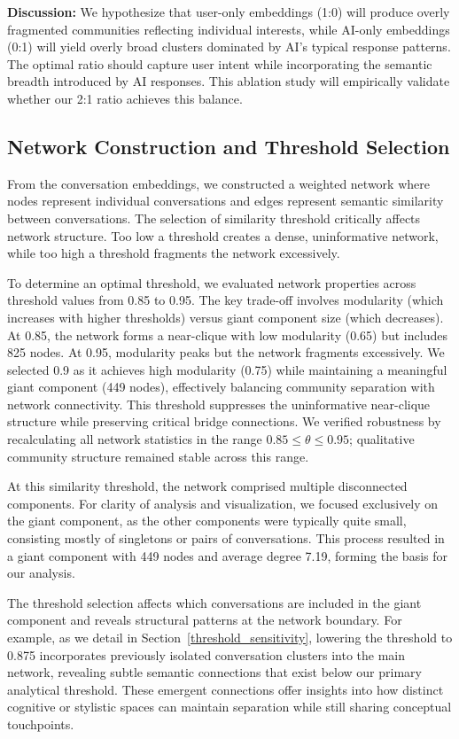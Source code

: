 \documentclass{svproc}
\begin{document}
\textbf{Discussion:} We hypothesize that user-only embeddings (1:0) will produce overly fragmented communities reflecting individual interests, while AI-only embeddings (0:1) will yield overly broad clusters dominated by AI's typical response patterns. The optimal ratio should capture user intent while incorporating the semantic breadth introduced by AI responses. This ablation study will empirically validate whether our 2:1 ratio achieves this balance.

\subsection{Network Construction and Threshold Selection}

From the conversation embeddings, we constructed a weighted network where nodes represent individual conversations and edges represent semantic similarity between conversations. The selection of similarity threshold critically affects network structure. Too low a threshold creates a dense, uninformative network, while too high a threshold fragments the network excessively.

To determine an optimal threshold, we evaluated network properties across threshold values from 0.85 to 0.95. The key trade-off involves modularity (which increases with higher thresholds) versus giant component size (which decreases). At 0.85, the network forms a near-clique with low modularity (0.65) but includes 825 nodes. At 0.95, modularity peaks but the network fragments excessively. We selected 0.9 as it achieves high modularity (0.75) while maintaining a meaningful giant component (449 nodes), effectively balancing community separation with network connectivity. This threshold suppresses the uninformative near-clique structure while preserving critical bridge connections. We verified robustness by recalculating all network statistics in the range $0.85 \le \theta \le 0.95$; qualitative community structure remained stable across this range.

At this similarity threshold, the network comprised multiple disconnected components. For clarity of analysis and visualization, we focused exclusively on the giant component, as the other components were typically quite small, consisting mostly of singletons or pairs of conversations. This process resulted in a giant component with 449 nodes and average degree 7.19, forming the basis for our analysis.

The threshold selection affects which conversations are included in the giant component and reveals structural patterns at the network boundary. For example, as we detail in Section~\ref{threshold_sensitivity}, lowering the threshold to 0.875 incorporates previously isolated conversation clusters into the main network, revealing subtle semantic connections that exist below our primary analytical threshold. These emergent connections offer insights into how distinct cognitive or stylistic spaces can maintain separation while still sharing conceptual touchpoints.
\end{document}
